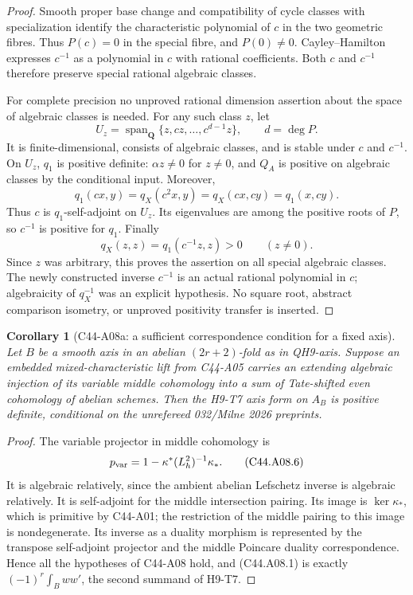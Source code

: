 \documentclass[11pt]{article}
\newtheorem{corollary}[theorem]{Corollary}
\theoremstyle{remark}\newtheorem{remark}[theorem]{Remark}
\begin{document}
\begin{proof}
Smooth proper base change and compatibility of cycle classes
with specialization identify the characteristic polynomial of
$c$ in the two geometric fibres. Thus $P(c)=0$ in the special
fibre, and $P(0)\ne0$. Cayley--Hamilton expresses $c^{-1}$ as a
polynomial in $c$ with rational coefficients. Both $c$ and
$c^{-1}$ therefore preserve special rational algebraic classes.

For complete precision no unproved rational dimension assertion
about the space of algebraic classes is needed. For any such
class $z$, let
\[
 U_z=\operatorname{span}_{\mathbf Q}
       \{z,cz,\ldots,c^{d-1}z\},\qquad d=\deg P.
\]
It is finite-dimensional, consists of algebraic classes, and is
stable under $c$ and $c^{-1}$. On $U_z$, $q_1$ is positive definite:
$\alpha z\ne0$ for $z\ne0$, and $Q_A$ is positive on algebraic
classes by the conditional input. Moreover,
\[
 q_1(cx,y)=q_X(c^2x,y)=q_X(cx,cy)=q_1(x,cy).
\]
Thus $c$ is $q_1$-self-adjoint on $U_z$. Its eigenvalues are among
the positive roots of $P$, so $c^{-1}$ is positive for $q_1$.
Finally
\[
                   q_X(z,z)=q_1(c^{-1}z,z)>0
                   \qquad(z\ne0).
 \tag{C44.A08.5}
\]
Since $z$ was arbitrary, this proves the assertion on all special
algebraic classes. The newly constructed inverse $c^{-1}$ is an
actual rational polynomial in $c$; algebraicity of $q_X^{-1}$ was
an explicit hypothesis. No square root,
abstract comparison isometry, or unproved positivity transfer
is inserted.
\end{proof}

\begin{corollary}[C44-A08a: a sufficient correspondence condition for a fixed axis]
Let $B$ be a smooth axis in an abelian $(2r+2)$-fold as in
QH9-axis. Suppose an embedded mixed-characteristic lift from
C44-A05 carries an extending algebraic injection of its variable
middle cohomology into a sum of Tate-shifted even cohomology of
abelian schemes. Then the H9-T7 axis form on $A_B$ is positive
definite, \emph{conditional on the unrefereed 032/Milne 2026
preprints}.
\end{corollary}

\begin{proof}
The variable projector in middle cohomology is
\[
       p_{\rm var}=1-\kappa^*(L_h^2)^{-1}\kappa_*.
 \tag{C44.A08.6}
\]
It is algebraic relatively, since the ambient abelian Lefschetz
inverse is algebraic relatively. It is self-adjoint for the
middle intersection pairing. Its image is $\ker\kappa_*$,
which is primitive by C44-A01; the restriction of the middle
pairing to this image is nondegenerate. Its inverse as a duality
morphism is represented by the transpose self-adjoint projector
and the middle Poincare duality correspondence. Hence all the
hypotheses of C44-A08 hold, and (C44.A08.1) is exactly
$(-1)^r\int_Bww'$, the second summand of H9-T7.
\end{proof}
\end{document}
